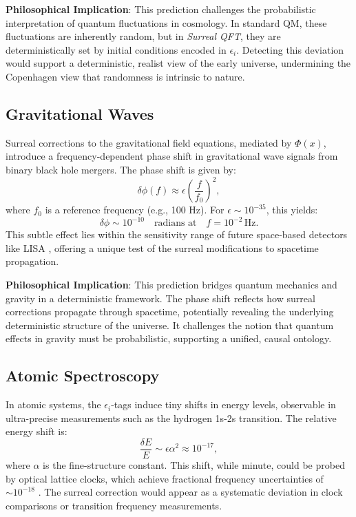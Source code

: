 \documentclass{article}
\begin{document}
\textbf{Philosophical Implication}: This prediction challenges the probabilistic interpretation of quantum fluctuations in cosmology. In standard QM, these fluctuations are inherently random, but in \textit{Surreal QFT}, they are deterministically set by initial conditions encoded in \(\epsilon_i\). Detecting this deviation would support a deterministic, realist view of the early universe, undermining the Copenhagen view that randomness is intrinsic to nature.

\subsection{Gravitational Waves}
Surreal corrections to the gravitational field equations, mediated by \(\Phi(x)\), introduce a frequency-dependent phase shift in gravitational wave signals from binary black hole mergers. The phase shift is given by:
\begin{equation}
\delta \phi(f) \approx \epsilon \left( \frac{f}{f_0} \right)^2,
\end{equation}
where \(f_0\) is a reference frequency (e.g., 100 Hz). For \(\epsilon \sim 10^{-35}\), this yields:
\begin{equation}
\delta \phi \sim 10^{-10} \quad \text{radians at} \quad f = 10^{-2} \, \text{Hz}.
\end{equation}
This subtle effect lies within the sensitivity range of future space-based detectors like LISA \cite{Amaro-Seoane2017}, offering a unique test of the surreal modifications to spacetime propagation.

\textbf{Philosophical Implication}: This prediction bridges quantum mechanics and gravity in a deterministic framework. The phase shift reflects how surreal corrections propagate through spacetime, potentially revealing the underlying deterministic structure of the universe. It challenges the notion that quantum effects in gravity must be probabilistic, supporting a unified, causal ontology.

\subsection{Atomic Spectroscopy}
In atomic systems, the \(\epsilon_i\)-tags induce tiny shifts in energy levels, observable in ultra-precise measurements such as the hydrogen 1s-2s transition. The relative energy shift is:
\begin{equation}
\frac{\delta E}{E} \sim \epsilon \alpha^2 \approx 10^{-17},
\end{equation}
where \(\alpha\) is the fine-structure constant. This shift, while minute, could be probed by optical lattice clocks, which achieve fractional frequency uncertainties of \(\sim 10^{-18}\) \cite{Ludlow2015}. The surreal correction would appear as a systematic deviation in clock comparisons or transition frequency measurements.
\end{document}

